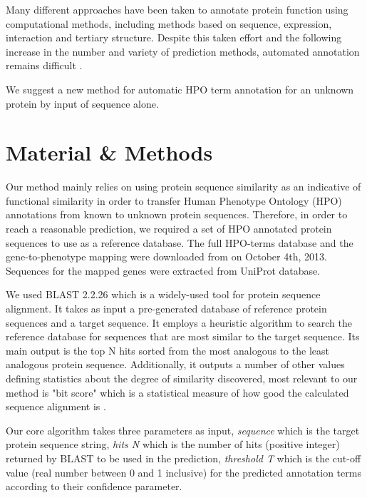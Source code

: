 \documentclass{bioinfo}
\begin{document}
Many different approaches have been taken to annotate protein function using computational methods, including methods based on sequence, expression, interaction and tertiary structure. Despite this taken effort and the following increase in the number and variety of prediction methods, automated annotation remains difficult \citep{Rodrigues07}.

We suggest a new method for automatic HPO term annotation for an unknown protein by input of sequence alone.

\section{Material \& Methods}

Our method mainly relies on using protein sequence similarity as an indicative of functional similarity in order to transfer Human Phenotype Ontology (HPO) annotations from known to unknown protein sequences. Therefore, in order to reach a reasonable prediction, we required a set of HPO annotated protein sequences to use as a reference database. The full HPO-terms database and the gene-to-phenotype mapping were downloaded from \cite{hpodb} on October 4th, 2013. Sequences for the mapped genes were extracted from UniProt \cite{uniprot} database.

We used BLAST 2.2.26 \cite{blastweb} which is a widely-used tool for protein sequence alignment. It takes as input a pre-generated database of reference protein sequences and a target sequence. It employs a heuristic algorithm to search the reference database for sequences that are most similar to the target sequence. Its main output is the top N hits sorted from the most analogous to the least analogous protein sequence. Additionally, it outputs a number of other values defining statistics about the degree of similarity discovered, most relevant to our method is "bit score" which is a statistical measure of how good the calculated sequence alignment is \cite{blastscore}.

Our core algorithm takes three parameters as input, \textit{sequence} which is the target protein sequence string, \textit{hits N} which is the number of hits (positive integer) returned by BLAST to be used in the prediction, \textit{threshold T} which is the cut-off value (real number between 0 and 1 inclusive) for the predicted annotation terms according to their confidence parameter.
\end{document}
